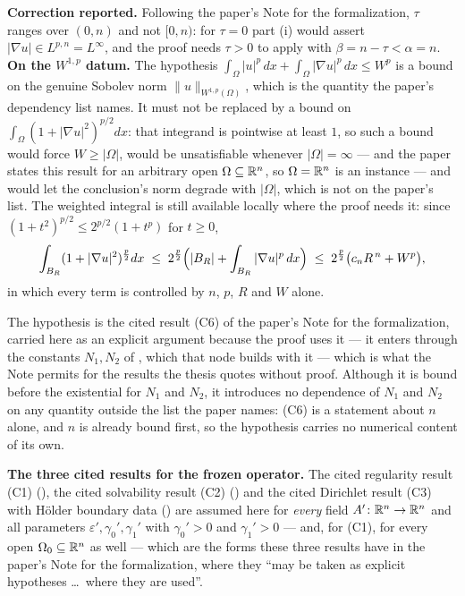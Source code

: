 \begin{theorem}[Theorem 5]
\medskip
\noindent\textbf{Correction reported.}  Following the paper's Note for the
formalization, $\tau$ ranges over $(0,n)$ and not $[0,n)$: for $\tau=0$ part (i)
would assert $|\nabla u|\in L^{p,n}=L^\infty$, and the proof needs $\tau>0$ to
apply  with $\beta=n-\tau<\alpha=n$.
\noindent\textbf{On the $W^{1,p}$ datum.}  The hypothesis
$\int_\Omega|u|^p\,dx+\int_\Omega|\nabla u|^p\,dx\le W^p$ is a bound on the
genuine Sobolev norm $\|u\|_{W^{1,p}(\Omega)}$, which is the quantity the
paper's dependency list names.  It must not be replaced by a bound on
$\int_\Omega(1+|\nabla u|^2)^{p/2}dx$: that integrand is pointwise at least $1$,
so such a bound would force $W\ge|\Omega|$, would be unsatisfiable whenever
$|\Omega|=\infty$ --- and the paper states this result for an arbitrary open
$\Omega\subseteq\mathbb{R}^n$, so $\Omega=\mathbb{R}^n$ is an instance --- and would let the
conclusion's norm degrade with $|\Omega|$, which is not on the paper's list.
The weighted integral is still available locally where the proof needs it: since
$(1+t^2)^{p/2}\le2^{p/2}(1+t^p)$ for $t\ge0$,
\[
\int_{B_R}(1+|\nabla u|^2)^{\frac p2}dx
\;\le\;2^{\frac p2}\Bigl(|B_R|+\int_{B_R}|\nabla u|^p\,dx\Bigr)
\;\le\;2^{\frac p2}\bigl(c_nR^{\,n}+W^p\bigr),
\]
in which every term is controlled by $n$, $p$, $R$ and $W$ alone.

The hypothesis  is the cited result (C6) of the
paper's Note for the formalization, carried here as an explicit argument because
the proof uses it --- it enters through the constants $N_1,N_2$ of
, which that node builds with it --- which is what the
Note permits for the results the thesis quotes without proof.  Although it is
bound before the existential for $N_1$ and $N_2$, it introduces no dependence of
$N_1$ and $N_2$ on any quantity outside the list the paper names: (C6) is a statement
about $n$ alone, and $n$ is already bound first, so the hypothesis carries no
numerical content of its own.

\medskip
\noindent\textbf{The three cited results for the frozen operator.}  The cited
regularity result (C1) (), the cited solvability
result (C2) () and the cited Dirichlet result (C3)
with H\"older boundary data () are assumed here
for \emph{every} field $A'\colon\mathbb{R}^n\to\mathbb{R}^n$ and all parameters
$\varepsilon',\gamma_0',\gamma_1'$ with $\gamma_0'>0$ and $\gamma_1'>0$ --- and,
for (C1), for every open $\Omega_0\subseteq\mathbb{R}^n$ as well --- which are the forms
these three results have in the paper's Note for the formalization, where they
``may be taken as explicit hypotheses \ldots\ where they are used''.


\end{theorem}
